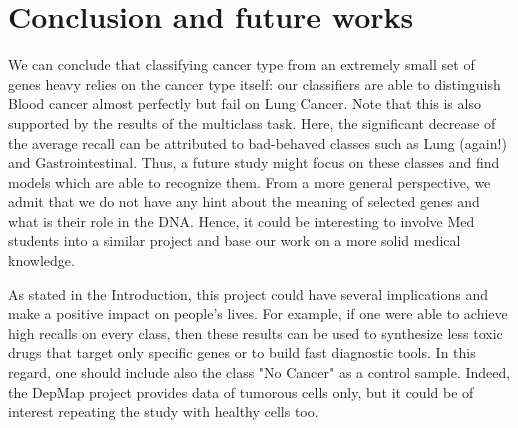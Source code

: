 \documentclass[a4paper,11pt, oneside]{article}  %
\begin{document}
\section{Conclusion and future works}
We can conclude that classifying cancer type from an extremely small set of genes heavy relies on the cancer type itself: our classifiers are able to distinguish Blood cancer almost perfectly but fail on Lung Cancer.  Note that this is also supported by the results of the multiclass task. Here, the significant decrease of the average recall can be attributed to bad-behaved classes such as Lung (again!) and Gastrointestinal. Thus, a future study might focus on these classes and find models which are able to recognize them.  From a more general perspective,  we admit that we do not have any hint about the meaning of selected genes and what is their role in the DNA.  Hence, it could be interesting to involve Med students into a similar project and base our work on a more solid medical knowledge.  

As stated in the Introduction, this project could have several implications and make a positive impact on people's lives. For example, if one were able to achieve high recalls on every class, then these results can be used to synthesize less toxic drugs that target only specific genes or to build fast diagnostic tools. In this regard, one should include also the class "No Cancer" as a control sample. Indeed, the DepMap project provides data of tumorous cells only, but it could be of interest repeating the study with healthy cells too.  
\end{document}
